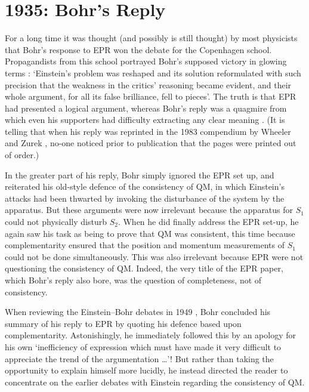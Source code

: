 \documentclass[12pt]{iopart}
\begin{document}
\section{1935: Bohr's Reply} \label{sec:Bohr} %
 
For a long time it was thought (and possibly is still thought) by most physicists that Bohr's response \cite{Boh35} to EPR won the debate for the Copenhagen school.
Propagandists from this school portrayed Bohr's supposed victory in glowing terms \cite{Ros64}: `Einstein's problem was reshaped and its solution reformulated with such precision that the weakness in the critics' reasoning became evident, and their whole argument, for all its false brilliance, fell to pieces'. The truth is that EPR had presented a logical argument,  whereas Bohr's reply was a quagmire from which even his supporters had difficulty extracting any clear meaning  \cite{Bel99,Wic95}. (It is telling that when his reply was reprinted in the 1983 compendium by Wheeler and Zurek \cite{WheZur83}, no-one noticed prior to publication that the pages were printed out of order.)
 
  In the greater part of his reply, Bohr simply ignored the EPR set up, and
reiterated his old-style defence of the consistency of QM,  in which Einstein's attacks had been thwarted by invoking the disturbance of  the system by the apparatus. But these arguments  were now irrelevant because the apparatus for $S_1$ could not physically disturb $S_2$. When he did finally address the EPR set-up, he again saw his task as being to prove that  QM was consistent,  
this time because complementarity ensured that 
the position and momentum measurements of $S_1$ could not be done
simultaneously. This was also irrelevant because EPR were not questioning the consistency of QM.  
Indeed, the very title of the EPR paper, which Bohr's reply also bore, 
 was the question of completeness, not of consistency.  
 
 When reviewing the Einstein--Bohr debates in 1949 \cite{BohrEinst}, Bohr
 concluded his summary of his reply to EPR by quoting his defence based upon complementarity. 
Astonishingly, he  immediately
  followed this by an apology for his own `inefficiency of expression which must have made it very difficult to appreciate the trend of the argumentation \ldots'!
But rather than taking the opportunity to explain himself more lucidly, 
he instead directed the reader to concentrate on the earlier debates with Einstein
regarding the consistency of QM. 
  
\end{document}
